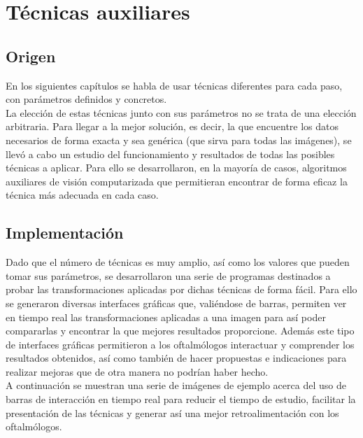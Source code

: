 \chapter{Técnicas auxiliares}
\section{Origen}
En los siguientes capítulos se habla de usar técnicas diferentes
para cada paso, con parámetros definidos y concretos. \\
La elección de estas técnicas junto con sus parámetros no se trata de
una elección arbitraria. Para llegar a la mejor solución, es decir, la
que encuentre los datos necesarios de forma exacta y sea genérica (que
sirva para todas las imágenes), se llevó a cabo un estudio del
funcionamiento y resultados de todas las posibles técnicas a aplicar.
Para ello se desarrollaron, en la mayoría de casos, algoritmos
auxiliares de visión computarizada que permitieran encontrar de forma
eficaz la técnica más adecuada en cada caso.

\section{Implementación}
Dado que el número de técnicas es muy amplio, así como los valores que
pueden tomar sus parámetros, se desarrollaron una serie de programas
destinados a probar las transformaciones aplicadas por dichas técnicas
de forma fácil. Para ello se generaron diversas interfaces gráficas
que, valiéndose de barras, permiten ver en tiempo real las
transformaciones aplicadas a una imagen para así poder compararlas y
encontrar la que mejores resultados proporcione. Además este tipo de
interfaces gráficas permitieron a los oftalmólogos interactuar y
comprender los resultados obtenidos, así como también de hacer
propuestas e indicaciones para realizar mejoras que de otra manera no
podrían haber hecho. \\

A continuación se muestran una serie de imágenes de ejemplo acerca del
uso de barras de interacción en tiempo real para reducir el tiempo de
estudio, facilitar la presentación de las técnicas y generar así una
mejor retroalimentación con los oftalmólogos.

